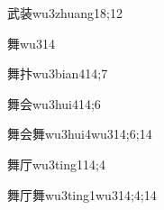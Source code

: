 \begin{verbete}{武装}{wu3zhuang1}{8;12}
\end{verbete}

\begin{verbete}{舞}{wu3}{14}
\end{verbete}

\begin{verbete}{舞抃}{wu3bian4}{14;7}
\end{verbete}

\begin{verbete}{舞会}{wu3hui4}{14;6}
\end{verbete}

\begin{verbete}{舞会舞}{wu3hui4wu3}{14;6;14}
\end{verbete}

\begin{verbete}{舞厅}{wu3ting1}{14;4}
\end{verbete}

\begin{verbete}{舞厅舞}{wu3ting1wu3}{14;4;14}
\end{verbete}

